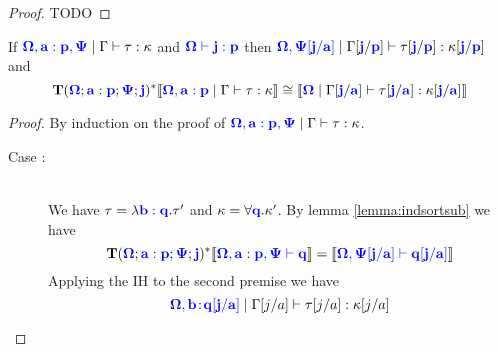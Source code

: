 \documentclass[sigplan,10pt,review,anonymous]{acmart}
\newcommand{\blu}[1]{\textbf{\color{blue}{#1}}}
\newcommand{\blum}[1]{\mathbf{\color{blue}{#1}}}
\newcommand{\sem}[1]{\llbracket #1 \rrbracket}
\newcommand{\mbf}[1]{\mathbf{#1}}
\begin{document}
\begin{proof}
TODO
\end{proof}

\begin{lemma}
If $\blum{\Omega,a : p, \Psi} \mid \Gamma \vdash \tau : \kappa$ and $\blum{\Omega \vdash j : p}$ then $\blum{\Omega, \Psi[j/a]} \mid \Gamma[\blum{j}/\blum{p}] \vdash \tau[\blum{j}/\blum{p}] : \kappa[\blum{j}/\blum{p}]$ and
$$\mbf{T}(\blum{\Omega} ; \blum{a : p} ; \blum{\Psi} ; \blu{j})^* \sem{\blum{\Omega, a:p} \mid \Gamma \vdash \tau : \kappa} \cong \sem{\blum{\Omega} \mid \Gamma[\blum{j}/\blum{a}] \vdash \tau[\blum{j}/\blum{a}] : \kappa[\blum{j}/\blum{a}]}$$
\end{lemma}

\begin{proof}
By induction on the proof of $\blum{\Omega, a : p, \Psi} \mid \Gamma \vdash \tau : \kappa$.
\begin{description}
\item [Case :]~\\
We have $\tau = \lambda \blum{b : q}. \tau'$ and $\kappa = \forall \blum{q}. \kappa'$.
By lemma \ref{lemma:indsortsub} we have $$\mbf{T}(\blum{\Omega} ; \blum{a : p} ; \blum{\Psi} ; \blu{j})^*\sem{\blum{\Omega,a:p,\Psi \vdash q}} = \sem{\blum{\Omega,\Psi[j/a] \vdash q[j/a]}}$$
Applying the IH to the second premise we have $$\blum{\Omega, b \! : \! q[j/a]} \mid \Gamma[j/a] \vdash \tau[j/a] : \kappa[j/a]$$
\end{description}

\end{proof}


\end{document}
